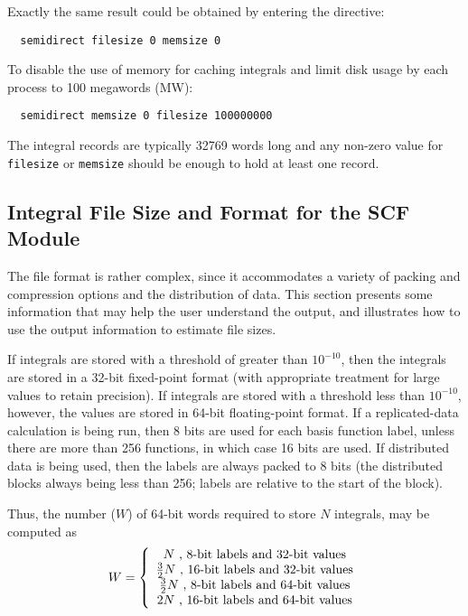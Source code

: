 Exactly the same result could be obtained by entering the directive:
\begin{verbatim}
  semidirect filesize 0 memsize 0
\end{verbatim}

To disable the use of memory for caching integrals and limit disk
usage by each process to 100 megawords (MW):
\begin{verbatim}
  semidirect memsize 0 filesize 100000000
\end{verbatim}

The integral records are typically 32769 words long and any non-zero
value for \verb+filesize+ or \verb+memsize+ should be enough to hold
at least one record.


\subsection{Integral File Size and Format for the SCF Module}

The file format is rather complex, since it accommodates a variety of
packing and compression options and the distribution of data.  This
section presents some information that may help the user understand
the output, and illustrates how to use the output information to
estimate file sizes.

If integrals are stored with a threshold of greater than $10^{-10}$,
then the integrals are stored in a 32-bit fixed-point format (with
appropriate treatment for large values to retain precision).  If
integrals are stored with a threshold less than $10^{-10}$, however,
the values are stored in 64-bit floating-point format.  If a
replicated-data calculation is being run, then 8 bits are used for
each basis function label, unless there are more than 256 functions,
in which case 16 bits are used.  If distributed data is being used,
then the labels are always packed to 8 bits (the distributed blocks
always being less than 256; labels are relative to the start of the
block).

Thus, the number ($W$) of 64-bit words required to store $N$
integrals, may be computed as
\begin{displaymath}
  W = \left\{ \\
      \begin{array}{c}
        N \mbox{ , 8-bit labels and 32-bit values} \\
        \frac{3}{2}N \mbox{ , 16-bit labels and 32-bit values} \\
        \frac{3}{2}N \mbox{ , 8-bit labels and 64-bit values} \\
        2N \mbox{ , 16-bit labels and 64-bit values} 
      \end{array}
      \right.
\end{displaymath}

